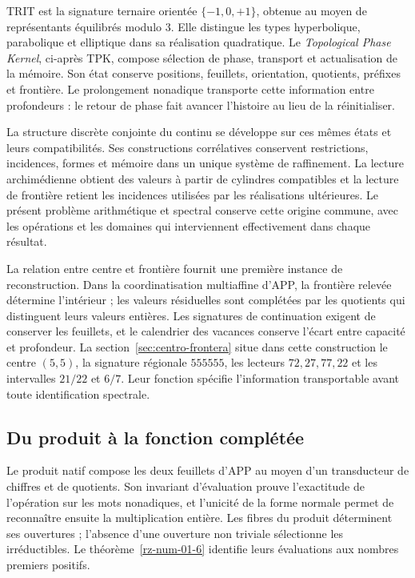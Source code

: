 TRIT est la signature ternaire orientée $\{-1,0,+1\}$, obtenue
au moyen de représentants équilibrés modulo $3$. Elle distingue les
types hyperbolique, parabolique et elliptique dans sa réalisation
quadratique. Le \emph{Topological Phase Kernel}, ci-après
TPK, compose sélection de phase, transport et actualisation de
la mémoire. Son état conserve positions, feuillets, orientation,
quotients, préfixes et frontière. Le prolongement nonadique transporte
cette information entre profondeurs : le retour de phase fait avancer
l’histoire au lieu de la réinitialiser.

La structure discrète conjointe du continu se développe sur ces mêmes états et leurs compatibilités. Ses constructions corrélatives conservent restrictions, incidences, formes et mémoire dans un unique système de raffinement. La lecture archimédienne obtient des valeurs à partir de cylindres compatibles et la lecture de frontière retient les incidences utilisées par les réalisations ultérieures. Le présent problème arithmétique et spectral conserve cette origine commune, avec les opérations et les domaines qui interviennent effectivement dans chaque résultat.

La relation entre centre et frontière fournit une première instance de reconstruction. Dans la coordinatisation multiaffine d'APP, la frontière relevée détermine l'intérieur ; les valeurs résiduelles sont complétées par les quotients qui distinguent leurs valeurs entières. Les signatures de continuation exigent de conserver les feuillets, et le calendrier des vacances conserve l'écart entre capacité et profondeur. La section~\ref{sec:centro-frontera} situe dans cette construction le centre $(5,5)$, la signature régionale $555555$, les lecteurs $72,27,77,22$ et les intervalles $21/22$ et $6/7$. Leur fonction spécifie l'information transportable avant toute identification spectrale.

\subsection*{Du produit à la fonction complétée}

Le produit natif compose les deux feuillets d’APP au moyen d’un
transducteur de chiffres et de quotients. Son invariant d’évaluation
prouve l’exactitude de l’opération sur les mots nonadiques,
et l’unicité de la forme normale permet de reconnaître ensuite la
multiplication entière. Les fibres du produit déterminent ses
ouvertures ; l’absence d’une ouverture non triviale sélectionne
les irréductibles. Le théorème~\ref{rz-num-01-6} identifie leurs
évaluations aux nombres premiers positifs.

